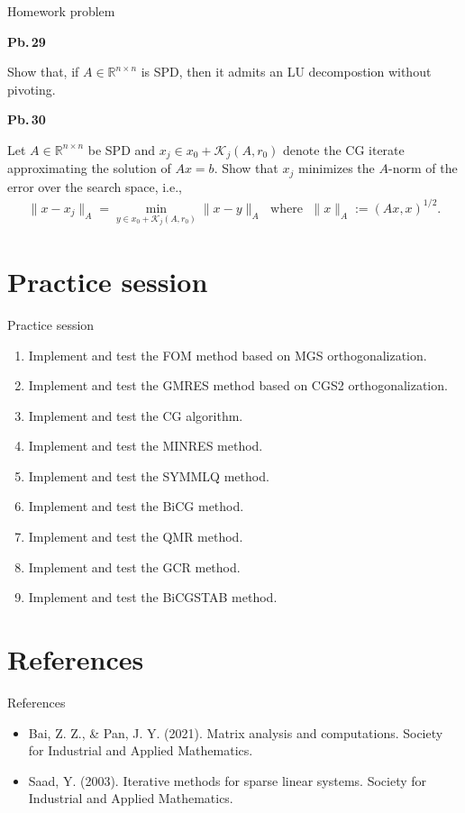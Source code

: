 \documentclass[t,usepdftitle=false]{beamer}
\begin{document}
\begin{frame}{Homework problem}\vspace{.1cm}
\begin{minipage}[t]{0.1\textwidth}
\textbf{Pb.$\,$29}
\end{minipage}
\begin{minipage}[t]{0.89\textwidth}
Show that, if $A\in\mathbb{R}^{n\times n}$ is SPD, then it admits an LU decompostion without pivoting.\\
\end{minipage}
\begin{minipage}[t]{0.1\textwidth}
\textbf{Pb.$\,$30}
\end{minipage}
\begin{minipage}[t]{0.89\textwidth}
Let $A\in\mathbb{R}^{n\times n}$ be SPD and $x_j\in x_0+\mathcal{K}_j(A,r_0)$ denote the CG iterate approximating the solution of $Ax=b$.
Show that $x_j$ minimizes the $A$-norm of the error over the search space, i.e.,
\begin{align*}
\|x-x_j\|_A=\min_{y\in x_0+\mathcal{K}_j(A,r_0)}\|x-y\|_A
\;\text{ where }\; 
\|x\|_A:=(Ax,x)^{1/2}.
\end{align*}
\end{minipage}
\end{frame}

\section{Practice session}
\begin{frame}{Practice session}
\begin{enumerate}
\item Implement and test the FOM method based on MGS orthogonalization.
\item Implement and test the GMRES method based on CGS2 orthogonalization.
\item Implement and test the CG algorithm.
\item Implement and test the MINRES method.
\item Implement and test the SYMMLQ method.
\item Implement and test the BiCG method.
\item Implement and test the QMR method.
\item Implement and test the GCR method.
\item Implement and test the BiCGSTAB method.
\end{enumerate}
\end{frame}

\section{References}
\begin{frame}{References}
\begin{itemize}
\item Bai, Z. Z., \& Pan, J. Y. (2021). Matrix analysis and computations. Society for Industrial and Applied Mathematics.
\item Saad, Y. (2003). Iterative methods for sparse linear systems. Society for Industrial and Applied Mathematics.
\end{itemize}
\end{frame}
\end{document}
